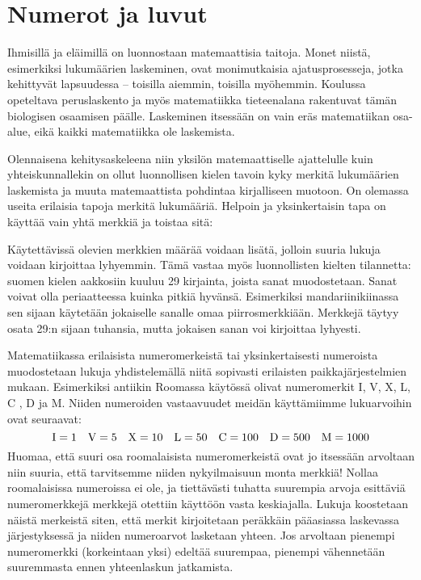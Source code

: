 \chapter{Numerot ja luvut}

Ihmisillä ja eläimillä on luonnostaan matemaattisia taitoja. Monet niistä, esimerkiksi lukumäärien laskeminen, ovat monimutkaisia ajatusprosesseja, jotka kehittyvät lapsuudessa – toisilla aiemmin, toisilla myöhemmin. Koulussa opeteltava peruslaskento ja myös matematiikka tieteenalana rakentuvat tämän biologisen osaamisen päälle. Laskeminen itsessään on vain eräs matematiikan osa-alue, eikä kaikki matematiikka ole laskemista.


Olennaisena kehitysaskeleena niin yksilön matemaattiselle ajattelulle kuin yhteiskunnallekin on ollut luonnollisen kielen tavoin kyky merkitä lukumäärien laskemista ja muuta matemaattista pohdintaa kirjalliseen muotoon. On olemassa
useita erilaisia tapoja merkitä lukumääriä. Helpoin ja yksinkertaisin tapa on käyttää vain yhtä merkkiä ja toistaa sitä:


Käytettävissä olevien merkkien määrää voidaan lisätä, jolloin suuria lukuja voidaan kirjoittaa lyhyemmin. Tämä vastaa myös luonnollisten kielten tilannetta: suomen kielen aakkosiin kuuluu 29 kirjainta, joista sanat muodostetaan. Sanat voivat olla periaatteessa kuinka pitkiä hyvänsä. Esimerkiksi mandariinikiinassa sen sijaan käytetään jokaiselle sanalle omaa piirrosmerkkiään. Merkkejä täytyy osata 29:n sijaan tuhansia, mutta jokaisen sanan voi kirjoittaa lyhyesti.

Matematiikassa erilaisista numeromerkeistä tai yksinkertaisesti numeroista muodostetaan lukuja yhdistelemällä niitä sopivasti erilaisten paikkajärjestelmien mukaan. Esimerkiksi antiikin Roomassa käytössä olivat numeromerkit I, V, X, L, C , D ja M. Niiden numeroiden vastaavuudet meidän käyttämiimme lukuarvoihin ovat seuraavat:
\begin{equation*}
\rm I=1\quad
V=5\quad
X=10\quad
L=50\quad
C=100\quad
D=500\quad
M=1 000
\end{equation*}
Huomaa, että suuri osa roomalaisista numeromerkeistä ovat jo itsessään arvoltaan niin suuria, että tarvitsemme niiden nykyilmaisuun monta merkkiä! Nollaa roomalaisissa numeroissa ei ole, ja tiettävästi tuhatta suurempia arvoja esittäviä numeromerkkejä merkkejä otettiin käyttöön vasta keskiajalla. 
Lukuja koostetaan näistä merkeistä siten, että merkit kirjoitetaan peräkkäin pääasiassa laskevassa järjestyksessä ja niiden numeroarvot lasketaan yhteen. Jos arvoltaan pienempi numeromerkki (korkeintaan yksi) edeltää suurempaa, pienempi vähennetään suuremmasta ennen yhteenlaskun jatkamista. 

